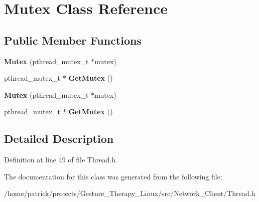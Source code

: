 \hypertarget{class_mutex}{}\section{Mutex Class Reference}
\label{class_mutex}
\subsection*{Public Member Functions}
\begin{DoxyCompactItemize}
\item 
\mbox{\label{class_mutex_a8bfca79d5a9a5f661b4e15d9016c588c}} 
{\bfseries Mutex} (pthread\+\_\+mutex\+\_\+t $\ast$mutex)
\item 
\mbox{\label{class_mutex_ab0f8e8e840155eed2ee4f89ede42b31b}} 
pthread\+\_\+mutex\+\_\+t $\ast$ {\bfseries Get\+Mutex} ()
\item 
\mbox{\label{class_mutex_a8bfca79d5a9a5f661b4e15d9016c588c}} 
{\bfseries Mutex} (pthread\+\_\+mutex\+\_\+t $\ast$mutex)
\item 
\mbox{\label{class_mutex_ab0f8e8e840155eed2ee4f89ede42b31b}} 
pthread\+\_\+mutex\+\_\+t $\ast$ {\bfseries Get\+Mutex} ()
\end{DoxyCompactItemize}


\subsection{Detailed Description}


Definition at line 49 of file Thread.\+h.



The documentation for this class was generated from the following file\+:\begin{DoxyCompactItemize}
\item 
/home/patrick/projects/\+Gesture\+\_\+\+Therapy\+\_\+\+Linux/src/\+Network\+\_\+\+Client/Thread.\+h\end{DoxyCompactItemize}
